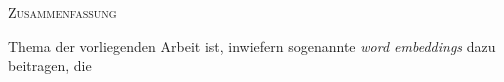 \begin{center}
  \textsc{Zusammenfassung}
\end{center}
%
\noindent
%
Thema der vorliegenden Arbeit ist, inwiefern sogenannte \textit{word embeddings} dazu beitragen, die 
